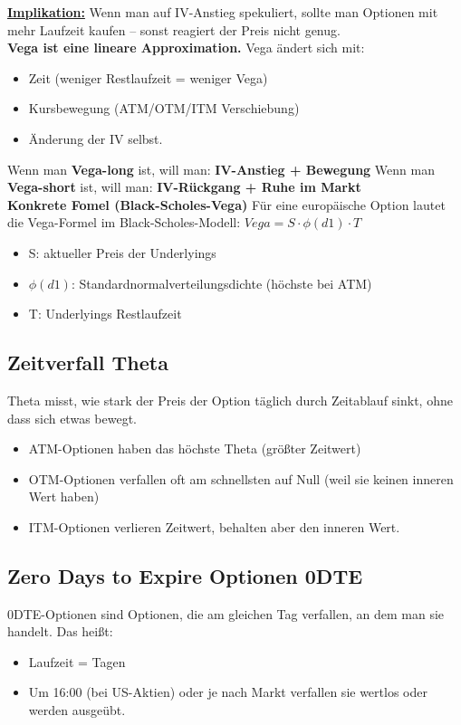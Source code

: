 \textbf{\underline{Implikation:}}
Wenn man auf IV-Anstieg spekuliert, sollte man Optionen mit mehr Laufzeit kaufen – sonst reagiert der Preis nicht genug. \\
\textbf{Vega ist eine lineare Approximation.}
Vega ändert sich mit:
\begin{itemize}
  \item Zeit (weniger Restlaufzeit = weniger Vega)
  \item Kursbewegung (ATM/OTM/ITM Verschiebung)
  \item Änderung der IV selbst.
\end{itemize}
Wenn man \textbf{Vega-long} ist, will man: \textbf{IV-Anstieg + Bewegung}
Wenn man \textbf{Vega-short} ist, will man: \textbf{IV-Rückgang + Ruhe im Markt}
\\
\textbf{Konkrete Fomel (Black-Scholes-Vega)}
Für eine europäische Option lautet die Vega-Formel im Black-Scholes-Modell: 
$ Vega=S⋅ϕ(d1)⋅T$
\begin{itemize}
  \item S: aktueller Preis der Underlyings
  \item $ϕ(d1)$: Standardnormalverteilungsdichte (höchste bei ATM)
  \item T: Underlyings Restlaufzeit
\end{itemize}

\subsection{Zeitverfall Theta}
Theta misst, wie stark der Preis der Option täglich durch Zeitablauf sinkt, ohne dass sich etwas bewegt. 
\begin{itemize}
  \item ATM-Optionen haben das höchste Theta (größter Zeitwert)
  \item OTM-Optionen verfallen oft am schnellsten auf Null (weil sie keinen inneren Wert haben)
  \item ITM-Optionen verlieren Zeitwert, behalten aber den inneren Wert.
\end{itemize}

\subsection{Zero Days to Expire Optionen 0DTE}
0DTE-Optionen sind Optionen, die am gleichen Tag verfallen, an dem man sie handelt. Das heißt:
\begin{itemize}
  \item Laufzeit = Tagen
  \item Um 16:00 (bei US-Aktien) oder je nach Markt verfallen sie wertlos oder werden ausgeübt.
\end{itemize}

